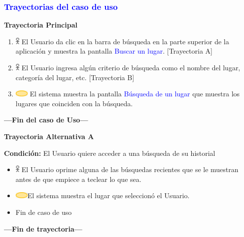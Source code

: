 \subsubsection{\textcolor{blue}{Trayectorias del caso de uso}}

\textbf{Trayectoria Principal}
\begin{enumerate}
    \item \includegraphics[width=0.0150\textwidth]{Figuras/persona.png} El Usuario da clic en la barra de búsqueda en la parte superior de la aplicación y muestra la pantalla \textcolor{blue}{Buscar un lugar}. [Trayectoria A]
    \item \includegraphics[width=0.0150\textwidth]{Figuras/persona.png} El Usuario ingresa algún criterio de búsqueda como el nombre del lugar, categoría del lugar, etc. [Trayectoria B]
    \item \includegraphics[width=0.0500\textwidth]{Figuras/sistema.png} El sistema muestra la pantalla \textcolor{blue}{Búsqueda de un lugar} que muestra los lugares que coinciden con la búsqueda.
\end{enumerate}
\textbf{---Fin del caso de Uso---}
\vspace{15pt}

\textbf{Trayectoria Alternativa A}
\vspace{10pt}

\textbf{Condición:} El Usuario quiere acceder a una búsqueda de su historial
\begin{itemize}
    \item \includegraphics[width=0.0150\textwidth]{Figuras/persona.png} El Usuario oprime alguna de las búsquedas recientes que se le muestran antes de que empiece a teclear lo que sea.
    \item \includegraphics[width=0.0500\textwidth]{Figuras/sistema.png}El sistema muestra el lugar que seleccionó el Usuario.
    \item Fin de caso de uso
\end{itemize}
\textbf{---Fin de trayectoria---}
\vspace{15pt}

